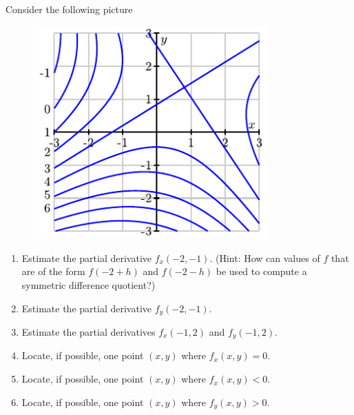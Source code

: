 \documentclass[12pt]{amsart}
\begin{document}
\begin{question}
	Consider the following picture
	\begin{figure}[ht]
		\begin{center}
			\includegraphics[width=0.8\textwidth]{fig/worksheet10-contour.pdf}
		\end{center}
	\end{figure}

	\begin{enumerate}
		\item Estimate the partial derivative \( f_x(-2, -1) \). (Hint: How can values of \( f \) that are of the form \( f(-2 + h) \) and \( f(-2 - h) \) be used to compute a symmetric difference quotient?)
		      \vspace{4cm}
		\item Estimate the partial derivative \( f_y(-2, -1) \).
		      \vspace{4cm}
		\item Estimate the partial derivatives \( f_x(-1,2) \) and \( f_y(-1,2) \).
		      \vspace{4cm}
		\item Locate, if possible, one point \( (x,y) \) where \( f_x(x,y) = 0 \).
		      \vspace{4cm}
		\item Locate, if possible, one point \( (x,y) \) where \( f_x(x,y) < 0 \).
		      \vspace{4cm}
		\item Locate, if possible, one point \( (x,y) \) where \( f_y(x,y) > 0 \).
		      \vspace{4cm}
	\end{enumerate}


\end{question}
\end{document}
